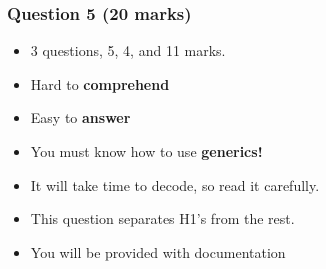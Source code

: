 \documentclass[]{article}
\providecommand{\tightlist}{%
  \setlength{\itemsep}{0pt}\setlength{\parskip}{0pt}}
\begin{document}
\hypertarget{question-5-20-marks}{%
\subsubsection{Question 5 (20 marks)}\label{question-5-20-marks}}

\begin{itemize}
\tightlist
\item
  3 questions, 5, 4, and 11 marks.
\item
  Hard to \textbf{comprehend}
\item
  Easy to \textbf{answer}
\item
  You must know how to use \textbf{generics!}
\item
  It will take time to decode, so read it carefully.
\item
  This question separates H1's from the rest.
\item
  You will be provided with documentation
\end{itemize}
\end{document}

